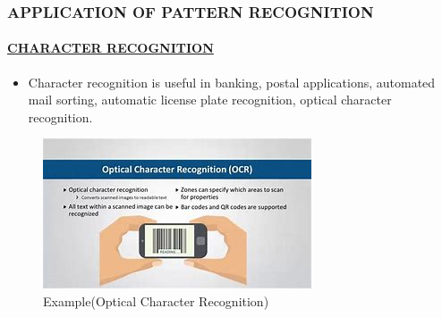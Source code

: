 \documentclass{beamer}
\begin{document}
\begin{frame}

\frametitle{APPLICATION OF PATTERN RECOGNITION}\pause
\framesubtitle{\underline{CHARACTER RECOGNITION }}\pause
 \begin{itemize}
 \item Character recognition is useful in banking, postal applications, automated mail sorting, automatic license plate recognition, optical character recognition.\pause
 \end{itemize}
 

\begin{figure}
\includegraphics[width=.8\textwidth]{ocr.jpg}
\caption{Example(Optical Character Recognition)}\pause
\end{figure} 
 
 
\end{frame}
\end{document}
